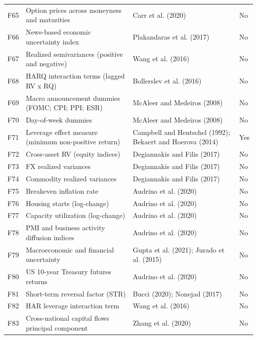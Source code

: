 {\begin{longtable}{>{\raggedright\arraybackslash}m{0.7cm}>{\raggedright\arraybackslash}m{5.5cm}>{\raggedright\arraybackslash}m{5.1cm}>{\raggedleft\arraybackslash}m{1.5cm}}
F65 & Option prices across moneyness and maturities & Carr et al. (2020) & No \\
F66 & News-based economic uncertainty index & Plakandaras et al. (2017) & No \\
F67 & Realized semivariances (positive and negative) & Wang et al. (2016) & No \\
F68 & HARQ interaction terms (lagged RV x RQ) & Bollerslev et al. (2016) & No \\
F69 & Macro announcement dummies (FOMC; CPI; PPI; ESR) & McAleer and Medeiros (2008) & No \\
F70 & Day-of-week dummies & McAleer and Medeiros (2008) & No \\
F71 & Leverage effect measure (minimum non-positive return) & Campbell and Hentschel (1992); Bekaert and Hoerova (2014) & Yes \\
F72 & Cross-asset RV (equity indices) & Degiannakis and Filis (2017) & No \\
F73 & FX realized variances & Degiannakis and Filis (2017) & No \\
F74 & Commodity realized variances & Degiannakis and Filis (2017) & No \\
F75 & Breakeven inflation rate & Audrino et al. (2020) & No \\
F76 & Housing starts (log-change) & Audrino et al. (2020) & No \\
F77 & Capacity utilization (log-change) & Audrino et al. (2020) & No \\
F78 & PMI and business activity diffusion indices & Audrino et al. (2020) & No \\
F79 & Macroeconomic and financial uncertainty & Gupta et al. (2021); Jurado et al. (2015) & No \\
F80 & US 10-year Treasury futures returns & Audrino et al. (2020) & No \\
F81 & Short-term reversal factor (STR) & Bucci (2020); Nonejad (2017) & No \\
F82 & HAR leverage interaction term & Wang et al. (2016) & No \\
F83 & Cross-national capital flows principal component & Zhang et al. (2020) & No \\
\end{longtable}
}
